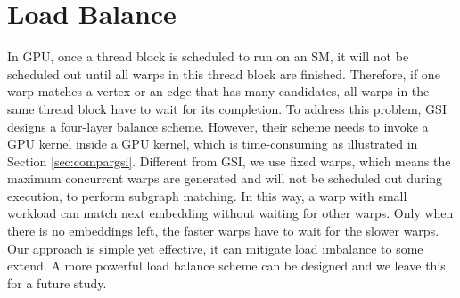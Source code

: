 \section{Load Balance} In GPU, once a thread block is scheduled to run on an SM, it will not be scheduled out until all warps in this
thread block are finished. Therefore, if one warp matches a vertex or an edge that has many candidates, all warps in the same thread block
have to wait for its completion. To address this problem, GSI designs a four-layer balance scheme. However, their scheme needs to invoke a
GPU kernel inside a GPU kernel, which is time-consuming as illustrated in Section \ref{sec:compargsi}. Different from GSI, we use fixed
warps, which means the maximum concurrent warps are generated and will not be scheduled out during execution, to perform subgraph matching.
In this way, a warp with small workload can match next embedding without waiting for other warps. Only when there is no embeddings left,
the faster warps have to wait for the slower warps. Our approach is simple yet effective, it can mitigate load imbalance to some extend. A
more powerful load balance scheme can be designed and we leave this for a future study.
